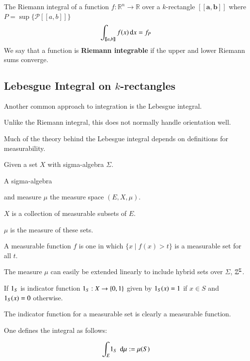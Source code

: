 \begin{definition}
The Riemann integral of a function $f:\mathbb{R}^n \to \mathbb{R}$ over a $k$-rectangle 
$[\![\boldsymbol{a}, \boldsymbol{b}]\!]$ where $P = \sup \Big\{ \mathcal{P} [\![a,b]\!] \Big\}$
	\begin{equation}
		\int_{[\![a,b]\!]} f(x) \mathop{}\!\mathrm{d} x = f_P
	\end{equation} 
	We say that a function is \textbf{Riemann integrable} if the upper and lower Riemann sums converge.
\end{definition}


\subsection{Lebesgue Integral on $k$-rectangles}

Another common approach to integration is the Lebesgue integral.

Unlike the Riemann integral, this does not normally handle orientation well.

Much of the theory behind the Lebesgue integral depends on definitions for measurability.

Given a set $X$ with sigma-algebra $\Sigma$.

A sigma-algebra 

and measure $\mu$ the measure space $(E, X, \mu)$.

$X$ is a collection of measurable subsets of $E$.

$\mu$ is the measure of these sets.

A measurable function $f$ is one in which $\{ x \; | \; f(x) > t\}$ is a measurable set for all $t$.

The measure $\mu$ can easily be extended linearly to include hybrid sets over $\Sigma$, $\hsetover[\Sigma]$.



If $\ind[S]$ is indicator function $\ind[S] : X \to \{ 0, 1 \}$ given by 
$\ind[S] (x) = 1$ if $x \in S$ and $\ind[S] (x) = 0$ otherwise.

The indicator function for a measurable set is clearly a measurable function.

One defines the integral as follows:

\begin{equation}
	\int_E \! \ind[S] \; \diff \mu := \mu ( S )
\end{equation}

